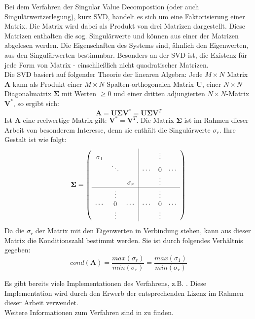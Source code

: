 Bei dem Verfahren der Singular Value Decompostion (oder auch Singulärwertzerlegung), kurz SVD, handelt es sich um eine Faktorisierung einer Matrix. Die Matrix wird dabei als Produkt von drei Matrizen dargestellt. Diese Matrizen enthalten die sog. Singulärwerte und können aus einer der Matrizen abgelesen werden. Die Eigenschaften des Systems sind, ähnlich den Eigenwerten, aus den Singulärwerten bestimmbar. Besonders an der SVD ist, die Existenz für jede Form von Matrix - einschließlich nicht quadratischer Matrizen.\\
Die SVD basiert auf folgender Theorie der linearen Algebra: Jede $M \times N$ Matrix $\mathbf{A}$ kann als Produkt einer $M \times N$ Spalten-orthogonalen Matrix $\mathbf{U}$, einer $N \times N$ Diagonalmatrix $\mathbf{\Sigma}$ mit Werten $\geq 0$ und einer dritten adjungierten $N \times N$-Matrix $\mathbf{V^*}$, so ergibt sich:
%
\begin{equation}
\mathbf{A}= \mathbf{U \Sigma V^*} = \mathbf{U \Sigma V}^T
\end{equation}
Ist $\mathbf{A}$ eine reelwertige Matrix gilt: $ \mathbf{V^*} = \mathbf{V}^T $. Die Matrix $\mathbf{ \Sigma }$ ist im Rahmen dieser Arbeit von besonderem Interesse, denn sie enthält die Singulärwerte $\sigma_r$. Ihre Gestalt ist wie folgt:
%
\begin{equation}
	\mathbf{\Sigma} = \left(\begin{array}{ccc|ccc}
	\sigma_1 &          &          &        & \vdots &        \\
	         & \ddots   &          & \cdots & 0      & \cdots \\
	         &          & \sigma_r &        & \vdots &        \\
	\hline
	         &  \vdots  &          &        & \vdots &        \\
	\cdots   &  0       & \cdots   & \cdots & 0      & \cdots \\
	         &  \vdots  &          &        & \vdots &        \\
	
	\end{array}\right)\nonumber
\end{equation}
%
%
Da die $\sigma_r$ der Matrix mit den Eigenwerten in Verbindung stehen, kann aus dieser Matrix die Konditionszahl bestimmt werden. Sie ist durch folgendes Verhältnis gegeben: 
\begin{equation}
	\label{eq:cond_from_svd}
	cond(\mathbf{A})=\frac{max(\sigma_r)}{min(\sigma_r)}=\frac{max(\sigma_1)}{min(\sigma_r)}
\end{equation} 

Es gibt bereits viele Implementationen des Verfahrens, z.B. \cite{press2007numerical}. Diese Implementation wird durch den Erwerb der entsprechenden Lizenz im Rahmen dieser Arbeit verwendet.\\

Weitere Informationen zum Verfahren sind in \cite[Kaptiel 4.6.3]{bronstejn2012taschenbuch} zu finden.